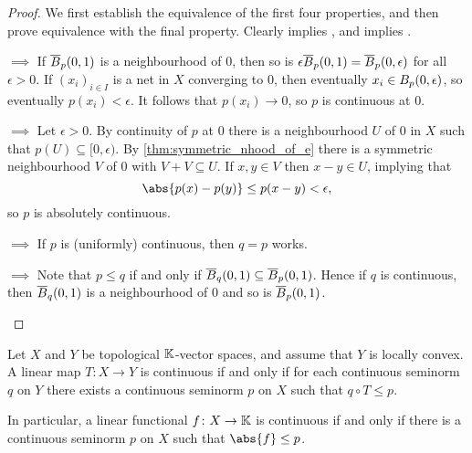 \documentclass[article, a4paper, 11pt, oneside]{memoir}
\numberwithin{equation}{chapter}
\begin{document}
\begin{proof}
    We first establish the equivalence of the first four properties, and then prove equivalence with the final property. Clearly  implies , and  implies .
    \begin{proofsec}
        \item[\subcref{enum:seminorm-closed-ball} $\implies$ \subcref{enum:seminorm-continuous-at-0}]
        If $\cball[p]{0}{1}$ is a neighbourhood of $0$, then so is $\epsilon \cball[p]{0}{1} = \cball[p]{0}{\epsilon}$ for all $\epsilon > 0$. If $(x_i)_{i \in I}$ is a net in $X$ converging to $0$, then eventually $x_i \in \ball[p]{0}{\epsilon}$, so eventually $p(x_i) < \epsilon$. It follows that $p(x_i) \to 0$, so $p$ is continuous at $0$.

        \item[\subcref{enum:seminorm-continuous-at-0} $\implies$ \subcref{enum:seminorm-uniformly-continuous}]
        Let $\epsilon > 0$. By continuity of $p$ at $0$ there is a neighbourhood $U$ of $0$ in $X$ such that $p(U) \subseteq [0,\epsilon)$. By \cref{thm:symmetric_nhood_of_e} there is a symmetric neighbourhood $V$ of $0$ with $V + V \subseteq U$. If $x,y \in V$ then $x-y \in U$, implying that
        \begin{equation*}
            \abs{p(x) - p(y)}
                \leq p(x-y)
                < \epsilon,
        \end{equation*}
        so $p$ is absolutely continuous.

        \item[\subcref{enum:seminorm-uniformly-continuous} $\implies$ \subcref{enum:seminorm-continuity-domination}]
        If $p$ is (uniformly) continuous, then $q = p$ works.

        \item[\subcref{enum:seminorm-continuity-domination} $\implies$ \subcref{enum:seminorm-closed-ball}]
        Note that $p \leq q$ if and only if $\cball[q]{0}{1} \subseteq \cball[p]{0}{1}$. Hence if $q$ is continuous, then $\cball[q]{0}{1}$ is a neighbourhood of $0$ and so is $\cball[p]{0}{1}$.
    \end{proofsec}
\end{proof}


\begin{proposition}
    \label{thm:continuity-by-seminorm-domination}
    Let $X$ and $Y$ be topological $\field$-vector spaces, and assume that $Y$ is locally convex. A linear map $T \colon X \to Y$ is continuous if and only if for each continuous seminorm $q$ on $Y$ there exists a continuous seminorm $p$ on $X$ such that $q \circ T \leq p$.

    In particular, a linear functional $f \colon X \to \field$ is continuous if and only if there is a continuous seminorm $p$ on $X$ such that $\abs{f} \leq p$.
\end{proposition}
\end{document}
